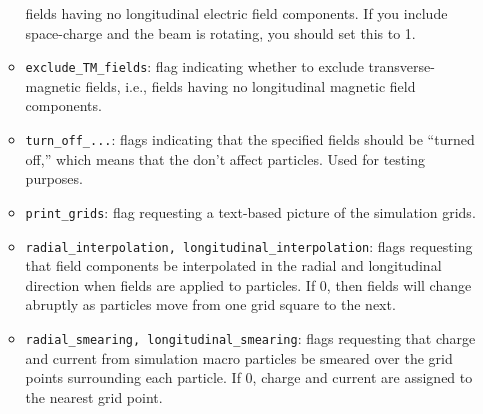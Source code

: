 \begin{itemize}
\begin{itemize}
        fields having no longitudinal electric field components.  If you include space-charge and the
        beam is rotating, you should set this to 1.
\item {\tt exclude\_TM\_fields}: flag indicating whether to exclude transverse-magnetic fields, i.e.,
        fields having no longitudinal magnetic field components.  
\item {\tt turn\_off\_...}: flags indicating that the specified fields should be ``turned off,'' which
  means that the don't affect particles.  Used for testing purposes.
\item {\tt print\_grids}: flag requesting a text-based picture of the simulation grids.
\item {\tt radial\_interpolation, longitudinal\_interpolation}: flags requesting that field components be 
        interpolated in the radial and longitudinal direction when fields are applied to particles.  If 0,
        then fields will change abruptly as particles move from one grid square to the next.  
\item {\tt radial\_smearing, longitudinal\_smearing}: flags requesting that charge and current from
        simulation macro particles be smeared over the grid points surrounding each particle.
        If 0, charge and current are assigned to the nearest grid point.
\end{itemize}

\end{itemize}
